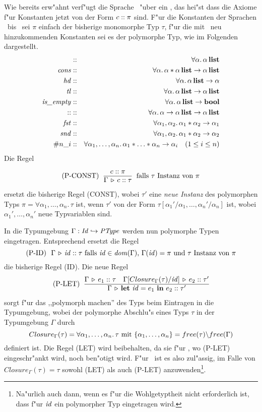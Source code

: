 Wie bereits erw"ahnt verf"ugt die Sprache \LTHREE\ "uber ein , das hei"st dass die Axiome f"ur
Konstanten jetzt von der Form $c\mathrel{::}\pi$ sind. F"ur die Konstanten der Sprachen \LONE\ bis \LTWO\ sei $\pi$
einfach der bisherige monomorphe Typ $\tau$, f"ur die mit \LTHREE\ neu hinzukommenden Konstanten sei es der
polymorphe Typ, wie im Folgenden dargestellt.
\begin{eqnarray*}
 [\,]         & :: & \forall\alpha.\,\listtype{\alpha} \\
\Cons         & :: & \forall\alpha.\,\alpha * \listtype{\alpha}\to \listtype{\alpha}\\
  \Hd         & :: & \forall\alpha.\,\listtype{\alpha} \to \alpha \\
  \Tl         & :: & \forall\alpha.\,\listtype{\alpha} \to \listtype{\alpha}\\
\Empty        & :: & \forall\alpha.\,\listtype{\alpha} \to \bool\\
 \coloncolon  & :: & \forall\alpha.\,\alpha \to \listtype{\alpha} \to \listtype{\alpha}\\
 \Fst         & :: & \forall\alpha_1,\alpha_2.\,\alpha_1 * \alpha_2 \to \alpha_1\\
 \Snd         & :: & \forall\alpha_1,\alpha_2.\,\alpha_1 * \alpha_2 \to \alpha_2\\
 \#n\_i       & :: & \forall\alpha_1,\ldots,\alpha_n.\,\alpha_1 * \ldots * \alpha_n \to \alpha_i \quad (1 \le i \le n)
\end{eqnarray*}
Die Regel
\[ \mbox{(P-CONST) }\ \regel{\tj{c}{\pi}}
                            {\Tj{\Gamma}{c}{\tau}}
   \ \mbox{ falls $\tau$ Instanz von $\pi$}\]
ersetzt die bisherige Regel (CONST), wobei $\tau'$ eine \emph{neue Instanz} des polymorphen Typs
$\pi = \forall\alpha_1,\ldots,\alpha_n.\,\tau$ ist, wenn $\tau'$ von der Form $\tau[\alpha_1'/\alpha_1,\ldots,\alpha_n'/\alpha_n]$
ist, wobei $\alpha_1',\ldots,\alpha_n'$ neue Typvariablen sind.

In die Typumgebung $\Gamma: {\text{\it Id\/}} \hookrightarrow {\text{\it PType\/}}$ werden nun polymorphe Typen eingetragen. Entsprechend ersetzt die Regel
\[ \mbox{(P-ID) }\ \Tj{\Gamma}{\id}{\tau} \reason{falls $\id \in \dom \Gamma$, $\Gamma(\id) = \pi$ und $\tau$ Instanz von $\pi$} \]
die bisherige Regel (ID). Die neue Regel
\[ \mbox{(P-LET) }\ \regel{\Tj{\Gamma}{e_1}{\tau}
                          \quad
                          \Tj{\Gamma[Closure_\Gamma(\tau)/\id]}{e_2}{\tau'}}
                          {\Tj{\Gamma}{\bli{\id}{e_1}{e_2}}{\tau'}}\]
sorgt f"ur das ,,polymorph machen'' des Typs beim Eintragen in die Typumgebung, wobei der polymorphe Abschlu"s eines Typs $\tau$
in der Typumgebung $\Gamma$ durch
\[
  Closure_\Gamma(\tau) = \forall\alpha_1,\ldots,\alpha_n.\,\tau \ \mbox{mit $\{\alpha_1,\ldots,\alpha_n\} = free(\tau) \backslash free(\Gamma)$}
\]
definiert ist. Die Regel (LET) wird beibehalten, da sie f"ur \LFOUR, wo (P-LET) eingeschr"ankt wird, noch ben"otigt wird. F"ur \LTHREE\ ist
es also zul"assig, im Falle von $Closure_\Gamma(\tau) = \tau$ sowohl (LET) als auch (P-LET) anzuwenden\footnote{Na"urlich auch dann, wenn
es f"ur die Wohlgetyptheit nicht erforderlich ist, dass f"ur ${\text{\it id\/}}$ ein polymorpher Typ eingetragen wird.}.


